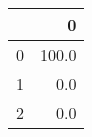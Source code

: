 \begin{tabular}{lr}
\toprule
{} &      0 \\
\midrule
0 &  100.0 \\
1 &    0.0 \\
2 &    0.0 \\
\bottomrule
\end{tabular}

